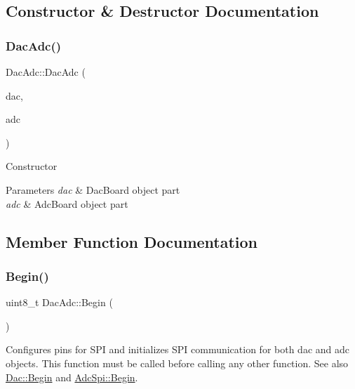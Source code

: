\subsection{Constructor \& Destructor Documentation}
\mbox{\label{classDacAdc_a44566ccabc0c62f8e1236ab3e0d3a7d3}} 
\subsubsection{\texorpdfstring{Dac\+Adc()}{DacAdc()}}
{\footnotesize\ttfamily Dac\+Adc\+::\+Dac\+Adc (\begin{DoxyParamCaption}\item[{\mbox{\hyperlink{classboard__types_1_1DacBoard}{board\+\_\+types\+::\+Dac\+Board}} \&}]{dac,  }\item[{\mbox{\hyperlink{classboard__types_1_1AdcBoard}{board\+\_\+types\+::\+Adc\+Board}} \&}]{adc }\end{DoxyParamCaption})}

Constructor 
\begin{DoxyParams}{Parameters}
{\em dac} & Dac\+Board object part \\
\hline
{\em adc} & Adc\+Board object part \\
\hline
\end{DoxyParams}


\subsection{Member Function Documentation}
\mbox{\label{classDacAdc_a47ca1d0dbf523906fe32363599772066}} 
\subsubsection{\texorpdfstring{Begin()}{Begin()}}
{\footnotesize\ttfamily uint8\+\_\+t Dac\+Adc\+::\+Begin (\begin{DoxyParamCaption}\item[{void}]{ }\end{DoxyParamCaption})}

Configures pins for S\+PI and initializes S\+PI communication for both dac and adc objects. This function must be called before calling any other function. See also \mbox{\hyperlink{classDac_a342bb811b205d50baacb3211e89ea062}{Dac\+::\+Begin}} and \mbox{\hyperlink{classAdcSpi_aa8f8f27578dd85cfcdbc9439bbce66cb}{Adc\+Spi\+::\+Begin}}. \mbox{\label{classDacAdc_a4d2b0df392722734dbac322b1d0fa08d}} 
